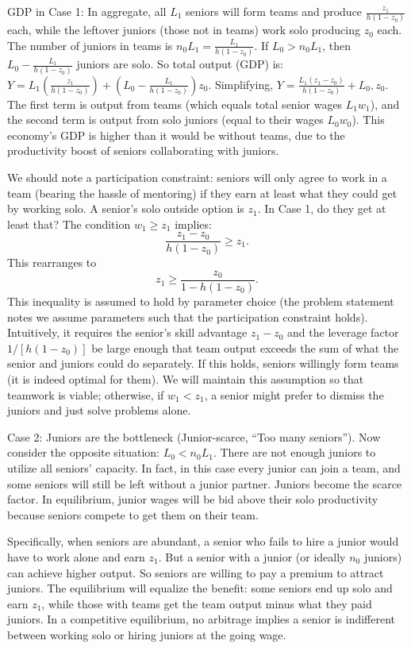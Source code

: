 \documentclass[12pt]{article}
\begin{document}
{GDP in Case 1:} In aggregate, all \(L_1\) seniors will form
teams and produce \(\frac{z_1}{h(1-z_0)}\) each, while the leftover
juniors (those not in teams) work solo producing \(z_0\) each. The
number of juniors in teams is \(n_0 L_1 = \frac{L_1}{h(1-z_0)}\). If
\(L_0 > n_0 L_1\), then \(L_0 - \frac{L_1}{h(1-z_0)}\) juniors are
solo. So total output (GDP) is:
\(Y = L_1 \left(\frac{z_1}{h(1-z_0)}\right) + \left(L_0 - \frac{L_1}{h(1-z_0)}\right) z_0.\)
Simplifying, $ Y = \frac{L_1(z_1 - z_0)}{h(1-z_0)} +
L_0,z_0.$ The first term is output from teams (which equals total
senior wages \(L_1 w_1\)), and the second term is output from solo
juniors (equal to their wages \(L_0 w_0\)). This economy's GDP is
higher than it would be without teams, due to the productivity boost
of seniors collaborating with juniors.

We should note a {participation constraint}: seniors will only
agree to work in a team (bearing the hassle of mentoring) if they earn
at least what they could get by working solo. A senior's solo outside
option is \(z_1\). In Case 1, do they get at least that? The condition
\(w_1 \ge z_1\) implies: 
$$
\frac{z_1 - z_0}{h(1-z_0)} \ge z_1.
$$
This rearranges to 
\begin{equation}
z_1 \ge \frac{z_0}{1 - h(1-z_0)}.
\tag{PC}
\end{equation}
This inequality is assumed to hold by parameter choice (the
problem statement notes we assume parameters such that the
participation constraint holds). Intuitively, it requires the senior's
skill advantage \(z_1 - z_0\) and the leverage factor \(1/[h(1-z_0)]\)
be large enough that team output exceeds the sum of what the senior
and juniors could do separately. If this holds, seniors willingly form
teams (it is indeed optimal for them). We will maintain this
assumption so that teamwork is viable; otherwise, if \(w_1 < z_1\), a
senior might prefer to dismiss the juniors and just solve problems
alone.
\item
{Case 2: Juniors are the bottleneck (Junior-scarce, ``Too many
seniors'').} Now consider the opposite situation: \(L_0 < n_0 L_1\).
There are not enough juniors to utilize all seniors' capacity. In
fact, in this case every junior can join a team, and some seniors will
still be left without a junior partner. Juniors become the scarce
factor. In equilibrium, junior wages will be bid {above} their
solo productivity because seniors compete to get them on their team.

Specifically, when seniors are abundant, a senior who fails to hire a
junior would have to work alone and earn \(z_1\). But a senior with a
junior (or ideally \(n_0\) juniors) can achieve higher output. So
seniors are willing to pay a premium to attract juniors. The
equilibrium will equalize the benefit: some seniors end up solo and
earn \(z_1\), while those with teams get the team output minus what
they paid juniors. In a competitive equilibrium, no arbitrage implies
a senior is indifferent between working solo or hiring juniors at the
going wage.
\end{document}
